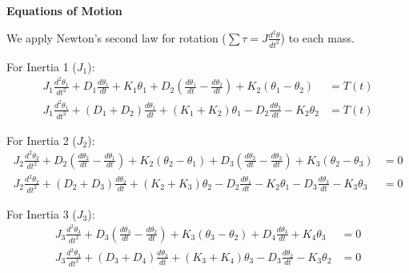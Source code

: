 \documentclass[11pt]{article}
\begin{document}
\begin{figure}[!ht]
\end{figure}

\noindent\textbf{Equations of Motion}

\vspace{8pt}

\noindent We apply Newton's second law for rotation ($\sum \tau = J \frac{d^2\theta}{dt^2}$) to each mass.

\vspace{8pt}

{For Inertia 1 ($J_1$):}
\begin{align*}
    J_1 \frac{d^2\theta_1}{dt^2} + D_1 \frac{d\theta_1}{dt} + K_1 \theta_1 + D_2\left(\frac{d\theta_1}{dt} - \frac{d\theta_2}{dt}\right) + K_2(\theta_1 - \theta_2) &= T(t) \\
    J_1 \frac{d^2\theta_1}{dt^2} + (D_1 + D_2)\frac{d\theta_1}{dt} + (K_1 + K_2)\theta_1 - D_2\frac{d\theta_2}{dt} - K_2\theta_2 &= T(t)
\end{align*}

{For Inertia 2 ($J_2$):}
\begin{align*}
    J_2 \frac{d^2\theta_2}{dt^2} + D_2\left(\frac{d\theta_2}{dt} - \frac{d\theta_1}{dt}\right) + K_2(\theta_2 - \theta_1) + D_3\left(\frac{d\theta_2}{dt} - \frac{d\theta_3}{dt}\right) + K_3(\theta_2 - \theta_3) &= 0 \\
    J_2 \frac{d^2\theta_2}{dt^2} + (D_2 + D_3)\frac{d\theta_2}{dt} + (K_2 + K_3)\theta_2 - D_2\frac{d\theta_1}{dt} - K_2\theta_1 - D_3\frac{d\theta_3}{dt} - K_3\theta_3 &= 0
\end{align*}

{For Inertia 3 ($J_3$):}
\begin{align*}
    J_3 \frac{d^2\theta_3}{dt^2} + D_3\left(\frac{d\theta_3}{dt} - \frac{d\theta_2}{dt}\right) + K_3(\theta_3 - \theta_2) + D_4 \frac{d\theta_3}{dt} + K_4 \theta_3 &= 0 \\
    J_3 \frac{d^2\theta_3}{dt^2} + (D_3 + D_4)\frac{d\theta_3}{dt} + (K_3 + K_4)\theta_3 - D_3\frac{d\theta_2}{dt} - K_3\theta_2 &= 0
\end{align*}
\end{document}
